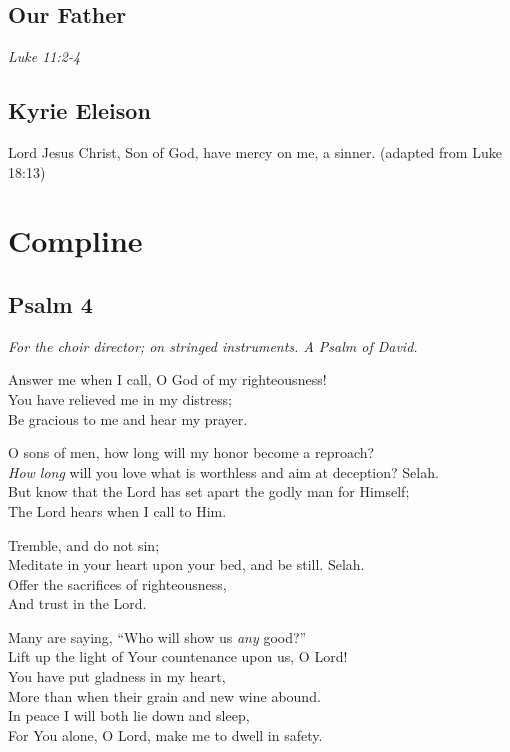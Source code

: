 \documentclass[14pt]{extbook}
\begin{document}
\hypertarget{our-father}{%
\subsection{Our Father}\label{our-father}}
\emph{Luke 11:2-4}

\hypertarget{kyrie-eleison}{%
\subsection{Kyrie Eleison}\label{kyrie-eleison}}
Lord Jesus Christ, Son of God, have mercy on me, a sinner. (adapted from Luke 18:13)

\newpage
\hypertarget{compline}{%
\section{Compline}\label{compline}}

\hypertarget{psalm-4}{%
\subsection{Psalm 4}\label{psalm-4}}

\emph{For the choir director; on stringed instruments. A Psalm of
David.}

Answer me when I call, O God of my righteousness!\\
You have relieved me in my distress;\\
Be gracious to me and hear my prayer.

O sons of men, how long will my honor become a reproach?\\
\emph{How long} will you love what is worthless and aim at deception?
Selah.\\
But know that the Lord has set apart the godly man for Himself;\\
The Lord hears when I call to Him.

Tremble, and do not sin;\\
Meditate in your heart upon your bed, and be still. Selah.\\
Offer the sacrifices of righteousness,\\
And trust in the Lord.

Many are saying, ``Who will show us \emph{any} good?''\\
Lift up the light of Your countenance upon us, O Lord!\\
You have put gladness in my heart,\\
More than when their grain and new wine abound.\\
In peace I will both lie down and sleep,\\
For You alone, O Lord, make me to dwell in safety.
\end{document}
